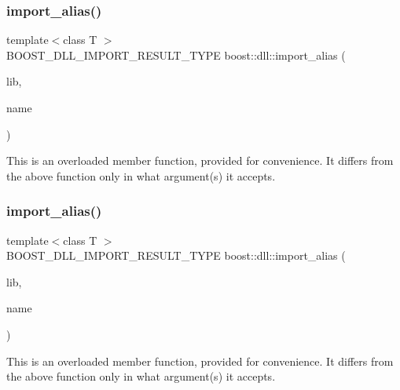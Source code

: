 \subsubsection{\texorpdfstring{import\+\_\+alias()}{import\_alias()}\hspace{0.1cm}{\footnotesize\ttfamily [5/6]}}
{\footnotesize\ttfamily template$<$class T $>$ \\
B\+O\+O\+S\+T\+\_\+\+D\+L\+L\+\_\+\+I\+M\+P\+O\+R\+T\+\_\+\+R\+E\+S\+U\+L\+T\+\_\+\+T\+Y\+PE boost\+::dll\+::import\+\_\+alias (\begin{DoxyParamCaption}\item[{B\+O\+O\+S\+T\+\_\+\+R\+V\+\_\+\+R\+EF(\hyperlink{a01708}{shared\+\_\+library})}]{lib,  }\item[{const char $\ast$}]{name }\end{DoxyParamCaption})}

This is an overloaded member function, provided for convenience. It differs from the above function only in what argument(s) it accepts. \mbox{\label{a00254_file_aeafedb58798e9bf6b793f3b54ac7bcfd}} 
\subsubsection{\texorpdfstring{import\+\_\+alias()}{import\_alias()}\hspace{0.1cm}{\footnotesize\ttfamily [6/6]}}
{\footnotesize\ttfamily template$<$class T $>$ \\
B\+O\+O\+S\+T\+\_\+\+D\+L\+L\+\_\+\+I\+M\+P\+O\+R\+T\+\_\+\+R\+E\+S\+U\+L\+T\+\_\+\+T\+Y\+PE boost\+::dll\+::import\+\_\+alias (\begin{DoxyParamCaption}\item[{B\+O\+O\+S\+T\+\_\+\+R\+V\+\_\+\+R\+EF(\hyperlink{a01708}{shared\+\_\+library})}]{lib,  }\item[{const std\+::string \&}]{name }\end{DoxyParamCaption})}

This is an overloaded member function, provided for convenience. It differs from the above function only in what argument(s) it accepts. 